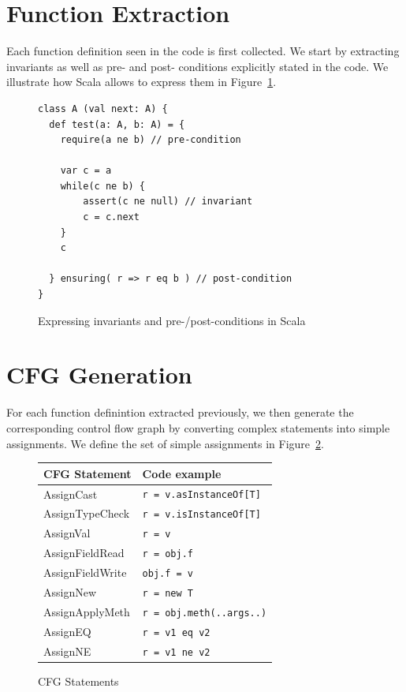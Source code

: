 \section{Function Extraction}
Each function definition seen in the code is first collected. We start by
extracting invariants as well as pre- and post- conditions explicitly stated in
the code. We illustrate how Scala allows to express them in
Figure~\ref{fig:fe:example1}.

\begin{figure}[h]
    \centering
\begin{lstlisting}
class A (val next: A) {
  def test(a: A, b: A) = {
    require(a ne b) // pre-condition

    var c = a
    while(c ne b) {
        assert(c ne null) // invariant
        c = c.next
    }
    c

  } ensuring( r => r eq b ) // post-condition
}
\end{lstlisting}
    \caption{Expressing invariants and pre-/post-conditions in Scala}
    \label{fig:fe:example1}
\end{figure}

\section{CFG Generation}
For each function definintion extracted previously, we then generate the
corresponding control flow graph by converting complex statements into simple
assignments. We define the set of simple assignments in
Figure~\ref{fig:cfg:statements}.

\FloatBarrier
\begin{figure}[h]
    \centering

    \begin{tabular}{ l | l }
        CFG Statement               & Code example \\
        \hline
        AssignCast       & \verb/r = v.asInstanceOf[T]/  \\
        AssignTypeCheck  & \verb/r = v.isInstanceOf[T]/  \\
        AssignVal        & \verb/r = v/  \\
        AssignFieldRead  & \verb/r = obj.f/  \\
        AssignFieldWrite & \verb/obj.f = v/  \\
        AssignNew        & \verb/r = new T/  \\
        AssignApplyMeth  & \verb/r = obj.meth(..args..)/  \\
        AssignEQ         & \verb/r = v1 eq v2/  \\
        AssignNE         & \verb/r = v1 ne v2/  \\
    \end{tabular}

    \caption{CFG Statements}
    \label{fig:cfg:statements}
\end{figure}

